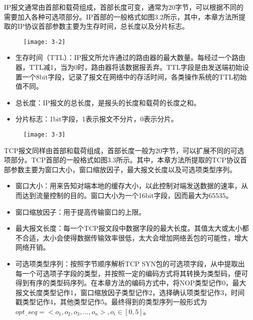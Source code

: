 IP报文通常由首部和载荷组成，首部长度可变，通常为20字节，可以根据不同的需要加入各种可选项部分。IP首部的一般格式如图3.2所示，其中，本章方法所提取的IP协议首部参数主要为生存时间，总长度以及分片标志。

\begin{figure}[!htbp]
    \centering
    \texttt{[image: 3-2]}
    \label{fig:3-2}
\end{figure}

\begin{itemize}
\item 
生存时间（TTL）：IP报文所允许通过的路由器的最大数量。每经过一个路由器，TTL减1，当为0时，路由器将该数据报丢弃。TTL字段是由发送端初始设置一个8bit字段，记录了报文在网络中的存活时间，各类操作系统的TTL初始值不同。
\item 
总长度：IP报文的总长度，是报头的长度和载荷的长度之和。
\item 
分片标志：1bit字段，1表示报文不分片，0表示分片。
\end{itemize}

\begin{figure}[!htbp]
    \centering
    \texttt{[image: 3-3]}
    \label{fig:3-3}
\end{figure}

TCP报文同样由首部和载荷组成，首部长度一般为20字节，可以扩展不同的可选项部分。TCP首部的一般格式如图3.3所示。其中，本章方法所提取的TCP协议首部参数主要为窗口大小，窗口缩放因子，最大报文长度以及可选项类型序列。

\begin{itemize}
\item 
窗口大小：用来告知对端本地的缓存大小，以此控制对端发送数据的速率，从而达到流量控制的目的。窗口大小为一个16bit字段，因而最大为65535。
\item 
窗口缩放因子：用于提高传输窗口的上限。
\item 
最大报文长度：每一个TCP报文段中数据字段的最大长度。其值太大或太小都不合适，太小会使得数据传输效率很低，太大会增加网络丢包的可能性，增大网络开销。
\item
可选项类型序列：按照字节顺序解析TCP SYN包的可选项字段，从中提取出每一个可选项子字段的类型，并按照一定的编码方式将其转换为类型码，便可得到有序的类型码序列。在本章方法的编码方式中，将NOP类型记作0，最大报文长度类型记作1，窗口缩放因子类型记作2，选择确认项类型记作3，时间戳类型记作4，其他类型记作5。最终得到的类型序列一般形式为$opt\underline{~~}seq=< o_{1},o_{2},o_{3},...,o_{n} >,o_{i}∈[0,5]$。
\end{itemize}


